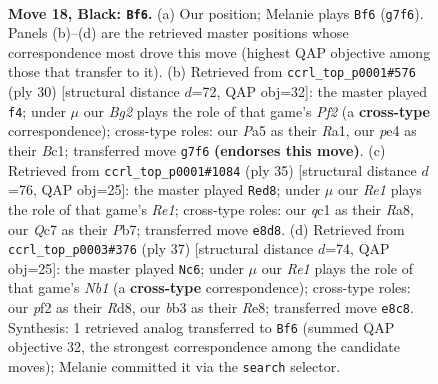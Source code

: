 \documentclass[11pt]{article}
\begin{document}
\clearpage

\begin{figure}[p]\centering
\begin{subfigure}{0.46\textwidth}\centering
\resizebox{\linewidth}{!}{%
\newchessgame
\chessboard[
  setfen={r3r1k1/1bqn1pbp/6p1/pppPp3/4P2B/1BP3PN/P4P1P/R1Q1K2R b - - 1 18},
  showmover=false,
  pgfstyle=straightmove, color=movearrow, markmove={g7-f6}
]}
\caption{}
\end{subfigure}\hfill
\begin{subfigure}{0.46\textwidth}\centering
\resizebox{\linewidth}{!}{%
\newchessgame
\chessboard[
  setfen={r3k2r/ppqnb1pp/2pp2b1/4p1P1/1PB1P3/P1N3QP/2P2P2/R1B2RK1 w kq - 1 16},
  showmover=false,
  pgfstyle=straightmove, color=movearrow, markmove={f2-f4}
]}
\caption{}
\end{subfigure}
\\[4pt]
\begin{subfigure}{0.46\textwidth}\centering
\resizebox{\linewidth}{!}{%
\newchessgame
\chessboard[
  setfen={r3r1k1/1p1nqpbp/2p3p1/p1p1p3/P3P3/2PPB1PP/1PQN1P2/4RRK1 b - - 4 18},
  showmover=false,
  pgfstyle=straightmove, color=movearrow, markmove={e8-d8}
]}
\caption{}
\end{subfigure}\hfill
\begin{subfigure}{0.46\textwidth}\centering
\resizebox{\linewidth}{!}{%
\newchessgame
\chessboard[
  setfen={1n1rr1k1/1bq2ppp/p2ppb2/2p5/2P1PP2/1P1B3Q/P2BN1PP/3R1RK1 b - - 6 19},
  showmover=false,
  pgfstyle=straightmove, color=movearrow, markmove={b8-c6}
]}
\caption{}
\end{subfigure}
\caption{\textbf{Move 18, Black: \texttt{Bf6}.} (a) Our position; Melanie plays \texttt{Bf6} (\texttt{g7f6}). Panels (b)--(d) are the retrieved master positions whose correspondence most drove this move (highest QAP objective among those that transfer to it). (b) Retrieved from \texttt{ccrl\_top\_p0001\#576} (ply 30) [structural distance $d$=72, QAP obj=32]: the master played \texttt{f4}; under $\mu$ our \emph{Bg2} plays the role of that game's \emph{Pf2} (a \textbf{cross-type} correspondence); cross-type roles: our \emph{P}a5 as their \emph{R}a1, our \emph{p}e4 as their \emph{B}c1; transferred move \texttt{g7f6} \textbf{(endorses this move)}. (c) Retrieved from \texttt{ccrl\_top\_p0001\#1084} (ply 35) [structural distance $d$=76, QAP obj=25]: the master played \texttt{Red8}; under $\mu$ our \emph{Re1} plays the role of that game's \emph{Re1}; cross-type roles: our \emph{q}c1 as their \emph{R}a8, our \emph{Q}c7 as their \emph{P}b7; transferred move \texttt{e8d8}. (d) Retrieved from \texttt{ccrl\_top\_p0003\#376} (ply 37) [structural distance $d$=74, QAP obj=25]: the master played \texttt{Nc6}; under $\mu$ our \emph{Re1} plays the role of that game's \emph{Nb1} (a \textbf{cross-type} correspondence); cross-type roles: our \emph{p}f2 as their \emph{R}d8, our \emph{b}b3 as their \emph{R}e8; transferred move \texttt{e8c8}. Synthesis: 1 retrieved analog transferred to \texttt{Bf6} (summed QAP objective 32, the strongest correspondence among the candidate moves); Melanie committed it via the \texttt{search} selector.}
\label{fig:thought-m35}
\end{figure}
\end{document}

